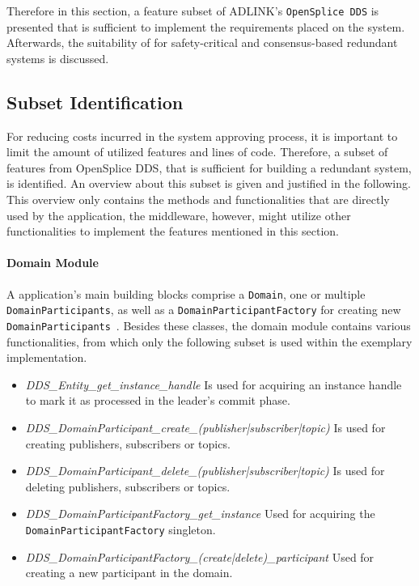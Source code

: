 Therefore in this section, a feature subset of ADLINK's \texttt{OpenSplice DDS} is presented that is sufficient to implement the requirements placed on the system.
Afterwards, the suitability of  for safety-critical and consensus-based redundant systems is discussed.
\subsection{ Subset Identification}

For reducing costs incurred in the system approving process, it is important to limit the amount of utilized features and lines of code.
Therefore, a subset of  features from OpenSplice DDS, that is sufficient for building a redundant system, is identified.
An overview about this subset is given and justified in the following.
This overview only contains the methods and functionalities that are directly used by the application, the middleware, however, might utilize other functionalities to implement the features mentioned in this section.

\paragraph{Domain Module}
A  application's main building blocks comprise a \texttt{Domain}, one or multiple \texttt{DomainParticipants}, as well as a \texttt{DomainParticipantFactory} for creating new \texttt{DomainParticipants}~\cite{omgDDSspec}.
Besides these classes, the domain module contains various functionalities, from which only the following subset is used within the exemplary implementation.

\begin{itemize}
\item \textit{DDS\_Entity\_get\_instance\_handle} Is used for acquiring an instance handle to mark it as processed in the leader's commit phase.
\item \textit{DDS\_DomainParticipant\_create\_(publisher|subscriber|topic)} Is used for creating  publishers, subscribers or topics.
\item \textit{DDS\_DomainParticipant\_delete\_(publisher|subscriber|topic)} Is used for deleting  publishers, subscribers or topics.
\item \textit{DDS\_DomainParticipantFactory\_get\_instance} Used for acquiring the \texttt{DomainParticipantFactory} singleton.
\item \textit{DDS\_DomainParticipantFactory\_(create|delete)\_participant} Used for creating a new participant in the  domain.
\end{itemize}

